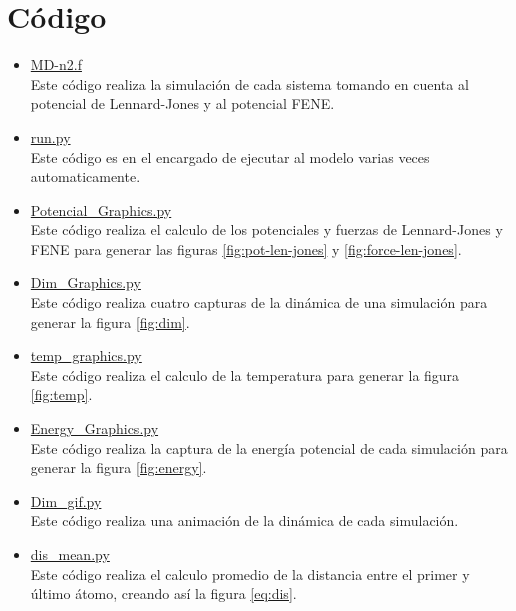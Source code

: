 \section{Código}
\begin{itemize}
    \item \href{https://github.com/giovannilopez9808/Notas_Agosto_2020/blob/master/Simulaciones/Proyecto_4/Scripts/MD-n2.f}{MD-n2.f}\\
    Este código realiza la simulación de cada sistema tomando en cuenta al potencial de Lennard-Jones y al potencial FENE.
    \item \href{https://github.com/giovannilopez9808/Notas_Agosto_2020/blob/master/Simulaciones/Proyecto_4/Scripts/run.py}{run.py}\\
    Este código es en el encargado de ejecutar al modelo varias veces automaticamente.
    \item \href{https://github.com/giovannilopez9808/Notas_Agosto_2020/blob/master/Simulaciones/Proyecto_4/Scripts/Potencial_Graphics.py}{Potencial\_Graphics.py}\\
    Este código realiza el calculo de los potenciales y fuerzas de Lennard-Jones y FENE para generar las figuras \ref{fig:pot-len-jones} y \ref{fig:force-len-jones}.
    \item \href{https://github.com/giovannilopez9808/Notas_Agosto_2020/blob/master/Simulaciones/Proyecto_4_2/Scripts/Dim_Graphics.py}{Dim\_Graphics.py}\\
    Este código realiza cuatro capturas de la dinámica de una simulación para generar la figura \ref{fig:dim}.
    \item \href{https://github.com/giovannilopez9808/Notas_Agosto_2020/blob/master/Simulaciones/Proyecto_4/Scripts/temp_graphics.py}{temp\_graphics.py}\\
    Este código realiza el calculo de la temperatura para generar la figura \ref{fig:temp}.
    \item \href{https://github.com/giovannilopez9808/Notas_Agosto_2020/blob/master/Simulaciones/Proyecto_4_2/Scripts/Energy_Graphics.py}{Energy\_Graphics.py}\\
    Este código realiza la captura de la energía potencial de cada simulación para generar la figura \ref{fig:energy}.
    \item \href{https://github.com/giovannilopez9808/Notas_Agosto_2020/blob/master/Simulaciones/Proyecto_4_2/Scripts/dim_gif.py}{Dim\_gif.py}\\
    Este código realiza una animación de la dinámica de cada simulación.
    \item \href{https://github.com/giovannilopez9808/Notas_Agosto_2020/blob/master/Simulaciones/Proyecto_4_2/Scripts/dis_mean.py}{dis\_mean.py}\\
    Este código realiza el calculo promedio de la distancia entre el primer y último átomo, creando así la figura \ref{eq:dis}.
\end{itemize}